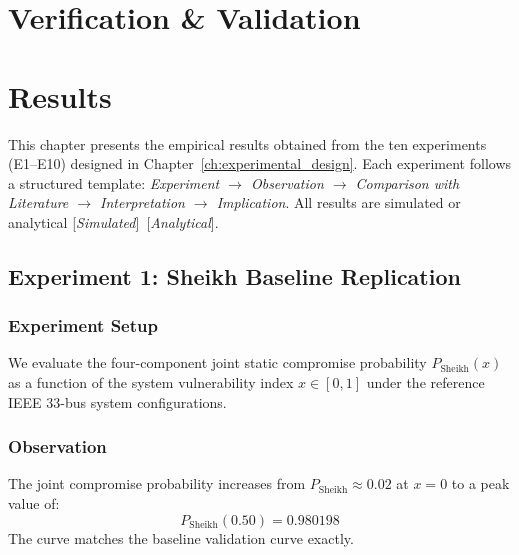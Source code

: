 \documentclass[12pt, oneside, a4paper]{report}
\theoremstyle{definition}
\theoremstyle{remark}
\newcommand{\analytical}{[\textit{Analytical}]}
\newcommand{\simulated}{[\textit{Simulated}]}
\begin{document}
\chapter{Verification \& Validation}
\label{ch:verification_validation}

\chapter{Results}
\label{ch:results}

This chapter presents the empirical results obtained from the ten experiments (E1--E10) designed in Chapter~\ref{ch:experimental_design}. Each experiment follows a structured template: \textit{Experiment $\to$ Observation $\to$ Comparison with Literature $\to$ Interpretation $\to$ Implication}. All results are simulated or analytical \simulated\ \analytical.

\bigskip

\section{Experiment 1: Sheikh Baseline Replication}
\label{sec:res:e1}

\subsection{Experiment Setup}
We evaluate the four-component joint static compromise probability $P_{\mathrm{Sheikh}}(x)$ as a function of the system vulnerability index $x \in [0, 1]$ under the reference IEEE 33-bus system configurations.

\subsection{Observation}
The joint compromise probability increases from $P_{\mathrm{Sheikh}} \approx 0.02$ at $x=0$ to a peak value of:
\begin{equation}
P_{\mathrm{Sheikh}}(0.50) = 0.980198
\end{equation}
The curve matches the baseline validation curve exactly.
\end{document}
